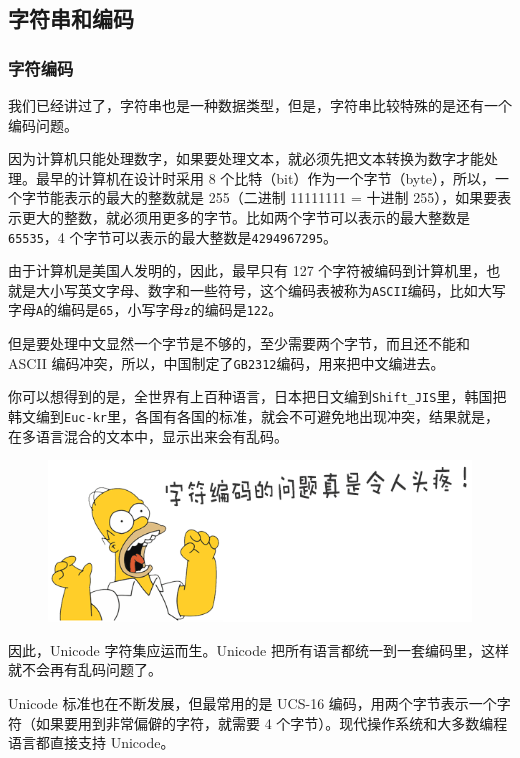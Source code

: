 \hypertarget{ux5b57ux7b26ux4e32ux548cux7f16ux7801}{%
\subsection{字符串和编码}\label{ux5b57ux7b26ux4e32ux548cux7f16ux7801}}

\hypertarget{ux5b57ux7b26ux7f16ux7801}{%
\subsubsection{字符编码}\label{ux5b57ux7b26ux7f16ux7801}}

我们已经讲过了，字符串也是一种数据类型，但是，字符串比较特殊的是还有一个编码问题。

因为计算机只能处理数字，如果要处理文本，就必须先把文本转换为数字才能处理。最早的计算机在设计时采用
8
个比特（bit）作为一个字节（byte），所以，一个字节能表示的最大的整数就是
255（二进制 11111111 = 十进制
255），如果要表示更大的整数，就必须用更多的字节。比如两个字节可以表示的最大整数是\texttt{65535}，4
个字节可以表示的最大整数是\texttt{4294967295}。

由于计算机是美国人发明的，因此，最早只有 127
个字符被编码到计算机里，也就是大小写英文字母、数字和一些符号，这个编码表被称为\texttt{ASCII}编码，比如大写字母\texttt{A}的编码是\texttt{65}，小写字母\texttt{z}的编码是\texttt{122}。

但是要处理中文显然一个字节是不够的，至少需要两个字节，而且还不能和 ASCII
编码冲突，所以，中国制定了\texttt{GB2312}编码，用来把中文编进去。

你可以想得到的是，全世界有上百种语言，日本把日文编到\texttt{Shift\_JIS}里，韩国把韩文编到\texttt{Euc-kr}里，各国有各国的标准，就会不可避免地出现冲突，结果就是，在多语言混合的文本中，显示出来会有乱码。

 
 \begin{figure}[htp]
	\centering
	\includegraphics[width=0.6\linewidth]{fig/9239304719270080.png}
\end{figure}


因此，Unicode 字符集应运而生。Unicode
把所有语言都统一到一套编码里，这样就不会再有乱码问题了。

Unicode 标准也在不断发展，但最常用的是 UCS-16
编码，用两个字节表示一个字符（如果要用到非常偏僻的字符，就需要 4
个字节）。现代操作系统和大多数编程语言都直接支持 Unicode。

